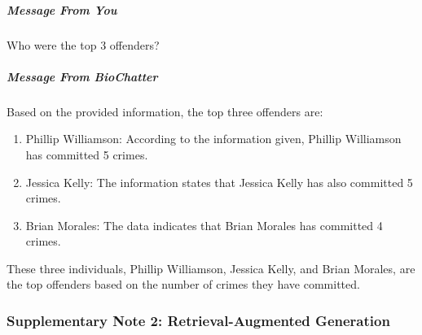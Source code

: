 \begin{Shaded}
\begin{Highlighting}[]
\end{Highlighting}
\end{Shaded}

\hypertarget{message-from-you-2}{%
\subparagraph{Message From You}\label{message-from-you-2}}

Who were the top 3 offenders?

\hypertarget{message-from-biochatter-2}{%
\subparagraph{Message From BioChatter}\label{message-from-biochatter-2}}

Based on the provided information, the top three offenders are:

\begin{enumerate}
\def\labelenumi{\arabic{enumi}.}
\item
  Phillip Williamson: According to the information given, Phillip Williamson has committed 5 crimes.
\item
  Jessica Kelly: The information states that Jessica Kelly has also committed 5 crimes.
\item
  Brian Morales: The data indicates that Brian Morales has committed 4 crimes.
\end{enumerate}

These three individuals, Phillip Williamson, Jessica Kelly, and Brian Morales, are the top offenders based on the number of crimes they have committed.

\begin{Shaded}
\begin{Highlighting}[]
\end{Highlighting}
\end{Shaded}

\hypertarget{supplementary-note-2-retrieval-augmented-generation}{%
\subsubsection{Supplementary Note 2: Retrieval-Augmented Generation}\label{supplementary-note-2-retrieval-augmented-generation}}

